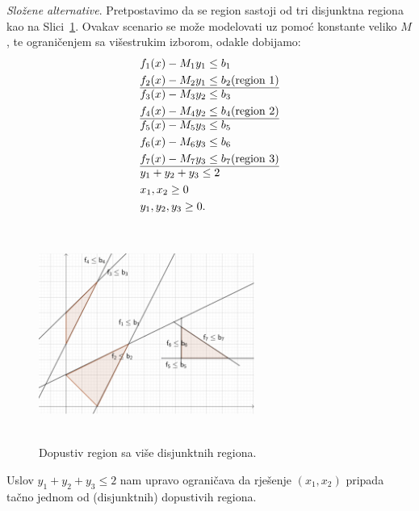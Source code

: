 \documentclass[a4paper, utf8, 11pt, colorlinks]{book}
\begin{document}
\emph{Složene alternative}. Pretpostavimo da se region sastoji od tri disjunktna regiona kao na Slici~\ref{fig:compound_regions}. Ovakav scenario se može modelovati uz pomoć konstante veliko $M$, te  ograničenjem sa višestrukim izborom, odakle dobijamo:
\begin{align*}
    &f_1(x) - M_1 y_1 \leq b_1 \\
    &f_2(x) - M_2 y_1 \leq b_2 (\mbox{region 1}) \\ \hline
    & f_3(x) - M_3 y_2 \leq b_3 \\ 
    & f_4(x) - M_4 y_2 \leq b_4 (\mbox{region 2})\\  \hline 
    & f_5(x) - M_5 y_3 \leq b_5 \\
    & f_6(x) - M_6 y_3 \leq b_6 \\
    & f_7(x) - M_7 y_3 \leq b_7 (\mbox{region 3}) \\ \hline
    & y_1 + y_2 + y_3 \leq 2 \\
    & x_1, x_2 \geq 0 \\
    & y_1, y_2, y_3 \geq 0.
\end{align*}

\begin{figure}[!ht]
    \centering
    \includegraphics[width=200pt, height=200pt]{compound.eps}
    \caption{Dopustiv region sa više disjunktnih regiona.}
    \label{fig:compound_regions}
\end{figure}
Uslov $y_1 + y_2 + y_3 \leq 2$ nam upravo ograničava da rješenje $(x_1, x_2)$ pripada tačno jednom od (disjunktnih) dopustivih regiona. 
\end{document}
